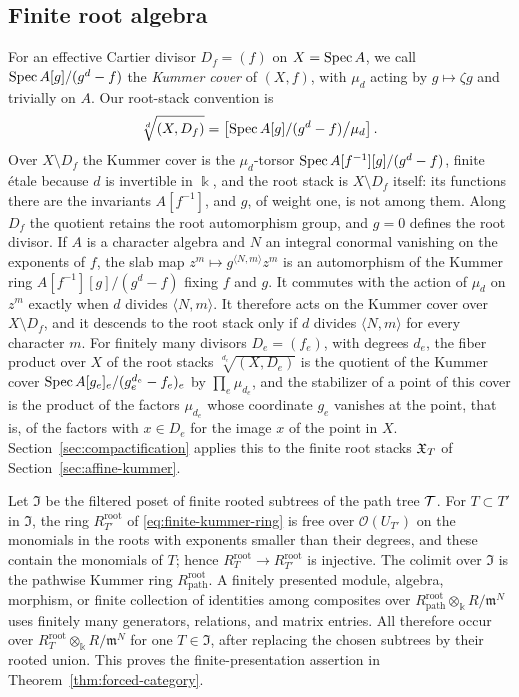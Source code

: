 \subsection{Finite root algebra}

For an effective Cartier divisor $D_f=(f)$ on $X=\operatorname{Spec} A$, we call
$\operatorname{Spec} A[g]/(g^d-f)$ the \emph{Kummer cover} of $(X,f)$, with $\mu_d$ acting
by $g\mapsto\zeta g$ and trivially on $A$.  Our root-stack convention is
\begin{equation}\label{eq:root-stack-chart-app}
 \sqrt[d]{(X,D_f)}
 =\left[\operatorname{Spec} A[g]/(g^d-f)\big/\mu_d\right].
\end{equation}
Over $X\setminus D_f$ the Kummer cover is the $\mu_d$-torsor
$\operatorname{Spec} A[f^{-1}][g]/(g^d-f)$, finite étale because $d$ is invertible in
$\Bbbk$, and the root stack is $X\setminus D_f$ itself: its functions there
are the invariants $A[f^{-1}]$, and $g$, of weight one, is not among them.
Along $D_f$ the quotient retains the root automorphism group, and $g=0$
defines the root divisor.  If $A$ is a character algebra and $N$ an integral
conormal vanishing on the exponents of $f$, the slab map
$z^m\mapsto g^{\langle N,m\rangle}z^m$ is an automorphism of the Kummer ring
$A[f^{-1}][g]/(g^d-f)$ fixing $f$ and $g$.  It commutes with the action of
$\mu_d$ on $z^m$ exactly when $d$ divides $\langle N,m\rangle$.  It
therefore acts on the Kummer cover over $X\setminus D_f$, and it descends to
the root stack only if $d$ divides $\langle N,m\rangle$ for every character
$m$.  For finitely many divisors $D_e=(f_e)$, with degrees $d_e$, the
fiber product over $X$ of the root stacks $\sqrt[d_e]{(X,D_e)}$ is the
quotient of the Kummer cover $\operatorname{Spec} A[g_e]_e/(g_e^{d_e}-f_e)_e$ by
$\prod_e\mu_{d_e}$, and the stabilizer of a point of this cover is the
product of the factors $\mu_{d_e}$ whose coordinate $g_e$ vanishes at the
point, that is, of the factors with $x\in D_e$ for the image $x$ of the
point in $X$.  Section~\ref{sec:compactification}
applies this to the finite root stacks $\mathfrak X_T$ of
Section~\ref{sec:affine-kummer}.

Let $\mathfrak I$ be the filtered poset of finite rooted subtrees of the path
tree $\mathcal T$.  For $T\subset T'$ in $\mathfrak I$, the ring
$R_{T'}^{\mathrm{root}}$ of \eqref{eq:finite-kummer-ring} is free over
$\mathcal O(U_{T'})$ on the monomials in the roots with exponents smaller
than their degrees, and these contain the monomials of $T$; hence
$R_T^{\mathrm{root}}\to R_{T'}^{\mathrm{root}}$ is injective.  The colimit
over $\mathfrak I$ is the pathwise Kummer ring
$R_{\mathrm{path}}^{\mathrm{root}}$.  A finitely presented module, algebra,
morphism, or finite collection of identities among composites over
$R_{\mathrm{path}}^{\mathrm{root}}\otimes_\Bbbk R/\mathfrak m^N$ uses finitely many
generators, relations, and matrix entries.  All therefore occur over
$R_T^{\mathrm{root}}\otimes_\Bbbk R/\mathfrak m^N$ for one $T\in\mathfrak I$, after
replacing the chosen subtrees by their rooted union.  This proves the
finite-presentation assertion in Theorem~\ref{thm:forced-category}.
